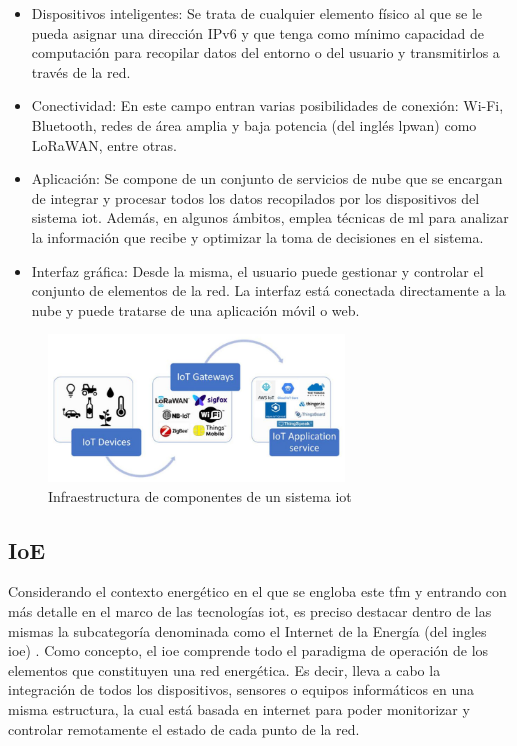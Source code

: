 \pagebreak

\begin{itemize}
    \item Dispositivos inteligentes: Se trata de cualquier elemento físico al que se le pueda asignar una dirección IPv6 y que tenga como mínimo capacidad de computación para recopilar datos del entorno o del usuario y transmitirlos a través de la red. 
    \item Conectividad: En este campo entran varias posibilidades de conexión: Wi-Fi, Bluetooth, redes de área amplia y baja potencia (del inglés \gls{lpwan}) como LoRaWAN, entre otras.
    \item Aplicación: Se compone de un conjunto de servicios de nube que se encargan de integrar y procesar todos los datos recopilados por los dispositivos del sistema \gls{iot}. Además, en algunos ámbitos, emplea técnicas de \gls{ml} para analizar la información que recibe y optimizar la toma de decisiones en el sistema.
    \item Interfaz gráfica: Desde la misma, el usuario puede gestionar y controlar el conjunto de elementos de la red. La interfaz está conectada directamente a la nube y puede tratarse de una aplicación móvil o web.
\end{itemize}

\begin{figure}[h!]
    \centering
    \includegraphics[width=0.7\textwidth]{img/teoria/iot.png}
    \caption{Infraestructura de componentes de un sistema \acrshort{iot} \cite{iotscheme}}
    \label{fig:iot}
\end{figure}

\subsection{IoE}
\label{sec:ioe}

Considerando el contexto energético en el que se engloba este \gls{tfm} y entrando con más detalle en el marco de las tecnologías \gls{iot}, es preciso destacar dentro de las mismas la subcategoría denominada como el Internet de la Energía (del ingles \gls{ioe}) \cite{ioe}. Como concepto, el \gls{ioe} comprende todo el paradigma de operación de los elementos que constituyen una red energética. Es decir, lleva a cabo la integración de todos los dispositivos, sensores o equipos informáticos en una misma estructura, la cual está basada en internet para poder monitorizar y controlar remotamente el estado de cada punto de la red.

